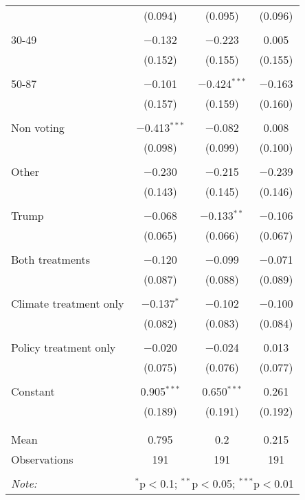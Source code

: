 \begin{tabular}{@{\extracolsep{5pt}}lccc}
  & (0.094) & (0.095) & (0.096) \\ 
  & & & \\ 
 30-49 & $-$0.132 & $-$0.223 & 0.005 \\ 
  & (0.152) & (0.155) & (0.155) \\ 
  & & & \\ 
 50-87 & $-$0.101 & $-$0.424$^{***}$ & $-$0.163 \\ 
  & (0.157) & (0.159) & (0.160) \\ 
  & & & \\ 
 Non voting & $-$0.413$^{***}$ & $-$0.082 & 0.008 \\ 
  & (0.098) & (0.099) & (0.100) \\ 
  & & & \\ 
 Other & $-$0.230 & $-$0.215 & $-$0.239 \\ 
  & (0.143) & (0.145) & (0.146) \\ 
  & & & \\ 
 Trump & $-$0.068 & $-$0.133$^{**}$ & $-$0.106 \\ 
  & (0.065) & (0.066) & (0.067) \\ 
  & & & \\ 
 Both treatments & $-$0.120 & $-$0.099 & $-$0.071 \\ 
  & (0.087) & (0.088) & (0.089) \\ 
  & & & \\ 
 Climate treatment only & $-$0.137$^{*}$ & $-$0.102 & $-$0.100 \\ 
  & (0.082) & (0.083) & (0.084) \\ 
  & & & \\ 
 Policy treatment only & $-$0.020 & $-$0.024 & 0.013 \\ 
  & (0.075) & (0.076) & (0.077) \\ 
  & & & \\ 
 Constant & 0.905$^{***}$ & 0.650$^{***}$ & 0.261 \\ 
  & (0.189) & (0.191) & (0.192) \\ 
  & & & \\ 
\hline \\[-1.8ex] 
Mean & 0.795 & 0.2 & 0.215 \\ 
Observations & 191 & 191 & 191 \\ 
\hline 
\hline \\[-1.8ex] 
\textit{Note:}  & \multicolumn{3}{r}{$^{*}$p$<$0.1; $^{**}$p$<$0.05; $^{***}$p$<$0.01} \\ 
\end{tabular} 
